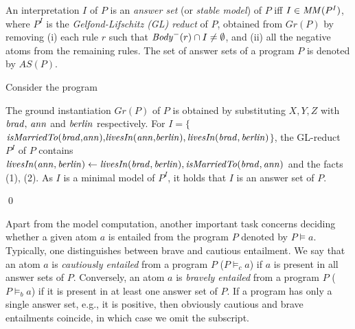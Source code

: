 \begin{definition}
An interpretation $I$ of $P$ is an \emph{answer set} (or \emph{stable model}) of $P$ iff $I \in \mathit{MM}(P^I)$, where $P^I$ is the \emph{Gelfond-Lifschitz (GL) reduct} of $P$, obtained from $Gr(P)$ by removing (i) each rule $r$ such that $\mathit{Body}^-(r) \cap I\neq\emptyset$, and (ii) all the negative atoms from the remaining rules. The set of answer sets of a program $P$ is denoted by $AS(P)$.
\end{definition}



\begin{example}\label{ex:as}
Consider the program \\
{\small {}}
            
\normalsize
{\smallskip

\noindent            
The ground instantiation $Gr(P)$ of $P$ is obtained by substituting $X,Y,Z$ with $\mathit{brad, \,ann}$ and $\mathit{berlin}$ respectively. For $I{=}\{${\small$\mathit{isMarriedTo(brad{,}ann){,}livesIn(ann{,}berlin)},\\ \mathit{livesIn(brad,berlin)}$}$\}$, the GL-reduct $P^I$ of $P$ contains $\mathit{livesIn(ann,berlin)}\leftarrow \mathit{livesIn(brad,berlin),isMarriedTo(brad,ann)}$ and the facts (1), (2). As $I$ is a minimal model of $P^I$, it holds that $I$ is an answer set of $P$.}\qed
\end{example}
\normalsize

Apart from the model computation, another important task concerns deciding whether a given atom $a$ is entailed from the program $P$ denoted by $P \models a$. Typically, one distinguishes between brave and cautious entailment. We say that an atom $a$ is \emph{cautiously entailed} from a program $P$ ($P \models_c a$) if $a$ is present in all answer sets of $P$. Conversely, an atom $a$ is \emph{bravely entailed} from a program $P$ ($P \models_b a$) if it is present in at least one answer set of $P$. If a program has only a single answer set, e.g., it is positive, then obviously cautious and brave entailments coincide, in which case we omit the subscript.

